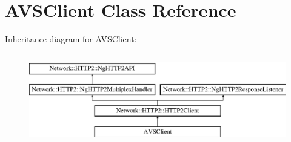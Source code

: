\hypertarget{classAVSClient}{}\section{A\+V\+S\+Client Class Reference}
\label{classAVSClient}
Inheritance diagram for A\+V\+S\+Client\+:\begin{figure}[H]
\begin{center}
\leavevmode
\includegraphics[height=4.000000cm]{d0/db9/classAVSClient}
\end{center}
\end{figure}
